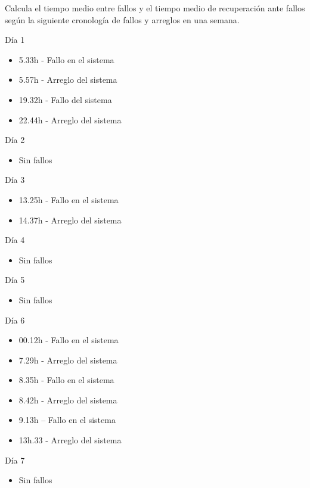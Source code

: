 

\begin{enunciado}
    Calcula el tiempo medio entre fallos y el tiempo medio de recuperación ante fallos según la siguiente
    cronología de fallos y arreglos en una semana.

    Día 1
    \begin{itemize}
        \item 5.33h - Fallo en el sistema
        \item 5.57h - Arreglo del sistema
        \item 19.32h - Fallo del sistema
        \item 22.44h - Arreglo del sistema
    \end{itemize}

    Día 2
    \begin{itemize}
        \item Sin fallos
    \end{itemize}

    Día 3
    \begin{itemize}
        \item 13.25h - Fallo en el sistema
        \item 14.37h - Arreglo del sistema
    \end{itemize}

    Día 4
    \begin{itemize}
        \item Sin fallos
    \end{itemize}

    Día 5
    \begin{itemize}
        \item Sin fallos
    \end{itemize}

    Día 6
    \begin{itemize}
        \item 00.12h - Fallo en el sistema
        \item 7.29h - Arreglo del sistema
        \item 8.35h - Fallo en el sistema
        \item 8.42h - Arreglo del sistema
        \item 9.13h – Fallo en el sistema
        \item 13h.33 - Arreglo del sistema
    \end{itemize}

    Día 7
    \begin{itemize}
        \item Sin fallos
    \end{itemize}
\end{enunciado}


